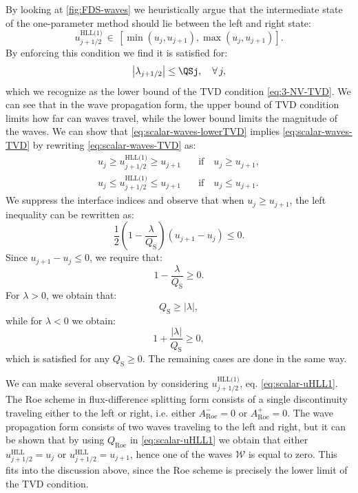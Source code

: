 By looking at \cref{fig:FDS-waves} we heuristically argue that the intermediate state of the one-parameter method should lie between the left and right state:
\begin{equation} \label{eq:scalar-waves-TVD}
u_{j+1/2}^\text{HLL(1)} \, \in \, \left[ \min \left( u_j, u_{j+1} \right), \max \left( u_j, u_{j+1} \right) \right].
\end{equation}
By enforcing this condition we find it is satisfied for:
\begin{equation} \label{eq:scalar-waves-lowerTVD}
\left| \lambda_{j+1/2} \right| \leq \QSj, \quad \forall \, j,
\end{equation}
which we recognize as the lower bound of the TVD condition \eqref{eq:3-NV-TVD}. We can see that in the wave propagation form, the upper bound of TVD condition limits how far can waves travel, while the lower bound limits the magnitude of the waves. We can show that \eqref{eq:scalar-waves-lowerTVD} implies \eqref{eq:scalar-waves-TVD} by rewriting \eqref{eq:scalar-waves-TVD} as:
\begin{align} 
u_j \geq u_{j+1/2}^\text{HLL(1)} \geq u_{j+1} \quad & \text{if} \quad u_{j} \geq u_{j+1}, \\
u_j \leq u_{j+1/2}^\text{HLL(1)} \leq u_{j+1} \quad & \text{if} \quad u_{j} \leq u_{j+1}.
\end{align}
We suppress the interface indices and observe that when $ u_{j} \geq u_{j+1} $, the left inequality can be rewritten as:
\begin{equation}
\frac{1}{2} \left( 1- \frac{\lambda}{Q_\text{S}} \right) \left( u_{j+1} - u_j \right) \leq 0.
\end{equation}
Since $ u_{j+1} - u_j \leq 0 $, we require that:
\begin{equation}
1 - \frac{\lambda}{Q_\text{S}} \geq 0.
\end{equation}
For $ \lambda > 0 $, we obtain that:
\begin{equation}
Q_\text{S} \geq |\lambda|,
\end{equation}
while for $ \lambda < 0 $ we obtain:
\begin{equation}
1 + \frac{|\lambda|}{Q_\text{S}} \geq 0,
\end{equation}
which is satisfied for any $ Q_\text{S} \geq 0 $. The remaining cases are done in the same way.

We can make several observation by considering $ u_{j+1/2}^\text{HLL(1)} $, eq. \eqref{eq:scalar-uHLL1}. The Roe scheme in flux-difference splitting form consists of a single discontinuity traveling either to the left or right, i.e. either $ A_\text{Roe}^{-} = 0 $ or $ A_\text{Roe}^{+} = 0 $. The wave propagation form consists of two waves traveling to the left and right, but it can be shown that by using $ Q_\text{Roe} $ in \eqref{eq:scalar-uHLL1} we obtain that either $ u_{j+1/2}^\text{HLL} = u_j $ or $ u_{j+1/2}^\text{HLL} = u_{j+1} $, hence one of the waves $ \mathcal{W} $ is equal to zero. This fits into the discussion above, since the Roe scheme is precisely the lower limit of the TVD condition.

